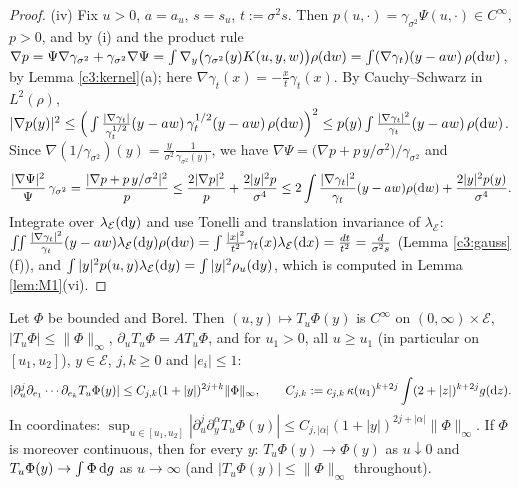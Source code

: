 \begin{proof}
(iv) Fix $u>0$, $a=a_u$, $s=s_u$, $t:=\sigma^2s$. Then $p(u,\cdot)=\gamma_{\sigma^2}\Psi(u,\cdot)\in C^\infty$, $p>0$, and by (i) and the product rule
$\nabla p=\Psi\nabla\gamma_{\sigma^2}+\gamma_{\sigma^2}\nabla\Psi=\int\nabla_y\big(\gamma_{\sigma^2}(y)K(u,y,w)\big)\rho(\mathrm{d} w)=\int(\nabla\gamma_t)(y-aw)\,\rho(\mathrm{d} w)$, by Lemma \ref{c3:kernel}(a); here $\nabla\gamma_t(x)=-\frac{x}{t}\gamma_t(x)$.
By Cauchy--Schwarz in $L^2(\rho)$,
$|\nabla p(y)|^2\le\Big(\int\frac{|\nabla\gamma_t|}{\gamma_t^{1/2}}(y-aw)\,\gamma_t^{1/2}(y-aw)\,\rho(\mathrm{d} w)\Big)^2\le p(y)\int\frac{|\nabla\gamma_t|^2}{\gamma_t}(y-aw)\,\rho(\mathrm{d} w)$.
Since $\nabla(1/\gamma_{\sigma^2})(y)=\frac{y}{\sigma^2}\frac1{\gamma_{\sigma^2}(y)}$, we have $\nabla\Psi=\big(\nabla p+p\,y/\sigma^2\big)/\gamma_{\sigma^2}$ and
\[
\frac{|\nabla\Psi|^2}{\Psi}\,\gamma_{\sigma^2}=\frac{|\nabla p+p\,y/\sigma^2|^2}{p}\le\frac{2|\nabla p|^2}{p}+\frac{2|y|^2p}{\sigma^4}\le2\int\frac{|\nabla\gamma_t|^2}{\gamma_t}(y-aw)\rho(\mathrm{d} w)+\frac{2|y|^2p(y)}{\sigma^4}.
\]
Integrate over $\lambda_{\mathcal E}(\mathrm{d} y)$ and use Tonelli and translation invariance of $\lambda_{\mathcal E}$:
$\int\!\!\int\frac{|\nabla\gamma_t|^2}{\gamma_t}(y-aw)\lambda_{\mathcal E}(\mathrm{d} y)\rho(\mathrm{d} w)=\int\frac{|x|^2}{t^2}\gamma_t(x)\lambda_{\mathcal E}(\mathrm{d} x)=\frac{dt}{t^2}=\frac{d}{\sigma^2s}$ (Lemma \ref{c3:gauss}(f)), and $\int|y|^2p(u,y)\lambda_{\mathcal E}(\mathrm{d} y)=\int|y|^2\rho_u(\mathrm{d} y)$, which is computed in Lemma \ref{lem:M1}(vi).
\end{proof}

\begin{lemma}\label{lem:M3}
Let $\Phi$ be bounded and Borel. Then $(u,y)\mapsto T_u\Phi(y)$ is $C^\infty$ on $(0,\infty)\times\mathcal E$, $|T_u\Phi|\le\|\Phi\|_\infty$, $\partial_uT_u\Phi=AT_u\Phi$, and for $u_1>0$, all $u\ge u_1$ (in particular on $[u_1,u_2]$), $y\in\mathcal E$, $j,k\ge0$ and $|e_i|\le1$:
\begin{equation}\label{c3:M3bound}
|\partial_u^j\partial_{e_1}\cdots\partial_{e_k}T_u\Phi(y)|\le C_{j,k}(1+|y|)^{2j+k}\|\Phi\|_\infty,\qquad C_{j,k}:=c_{j,k}\,\kappa(u_1)^{k+2j}\int(2+|z|)^{k+2j}g(\mathrm{d} z).
\end{equation}
In coordinates: $\sup_{u\in[u_1,u_2]}|\partial_u^j\partial_y^\alpha T_u\Phi(y)|\le C_{j,|\alpha|}(1+|y|)^{2j+|\alpha|}\|\Phi\|_\infty$.
If $\Phi$ is moreover continuous, then for every $y$: $T_u\Phi(y)\to\Phi(y)$ as $u\downarrow0$ and $T_u\Phi(y)\to\int\Phi\,\mathrm{d} g$ as $u\to\infty$ (and $|T_u\Phi(y)|\le\|\Phi\|_\infty$ throughout).
\end{lemma}

